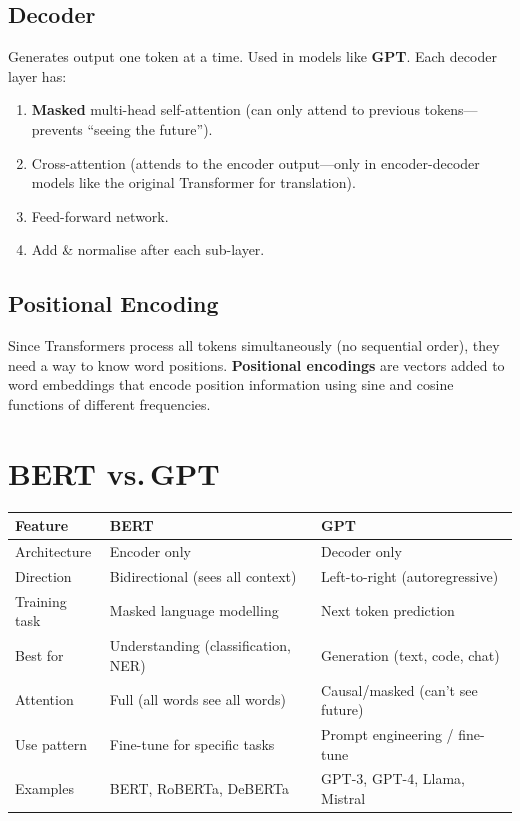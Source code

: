 \documentclass[12pt, a4paper, oneside]{book}
\begin{document}
\subsection{Decoder}

Generates output one token at a time. Used in models like \textbf{GPT}. Each decoder layer has:
\begin{enumerate}[leftmargin=2em]
    \item \textbf{Masked} multi-head self-attention (can only attend to previous tokens---prevents ``seeing the future'').
    \item Cross-attention (attends to the encoder output---only in encoder-decoder models like the original Transformer for translation).
    \item Feed-forward network.
    \item Add \& normalise after each sub-layer.
\end{enumerate}

\subsection{Positional Encoding}

Since Transformers process all tokens simultaneously (no sequential order), they need a way to know word positions. \textbf{Positional encodings} are vectors added to word embeddings that encode position information using sine and cosine functions of different frequencies.

\section{BERT vs.\,GPT}

\begin{center}
\begin{tabular}{l l l}
\toprule
\textbf{Feature} & \textbf{BERT} & \textbf{GPT} \\
\midrule
Architecture & Encoder only & Decoder only \\
Direction & Bidirectional (sees all context) & Left-to-right (autoregressive) \\
Training task & Masked language modelling & Next token prediction \\
Best for & Understanding (classification, NER) & Generation (text, code, chat) \\
Attention & Full (all words see all words) & Causal/masked (can't see future) \\
Use pattern & Fine-tune for specific tasks & Prompt engineering / fine-tune \\
Examples & BERT, RoBERTa, DeBERTa & GPT-3, GPT-4, Llama, Mistral \\
\bottomrule
\end{tabular}
\end{center}
\end{document}
